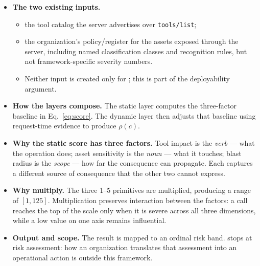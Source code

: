 \begin{itemize}
  \item \textbf{The two existing inputs.}
    \begin{itemize}
      \item the tool catalog the server advertises over \texttt{tools/list};
      \item the organization's policy/register for the assets exposed through
            the server, including named classification classes and recognition
            rules, but not framework-specific severity numbers.
      \item Neither input is created only for \framework{}; this is part of the
            deployability argument.
    \end{itemize}

  \item \textbf{How the layers compose.}
        The static layer computes the three-factor baseline in
        Eq.~\ref{eq:score}. The dynamic layer then adjusts that baseline using
        request-time evidence to produce $\rho(c)$.

  \item \textbf{Why the static score has three factors.}
        Tool impact is the \emph{verb} --- what the operation does; asset
        sensitivity is the \emph{noun} --- what it touches; blast radius is the
        \emph{scope} --- how far the consequence can propagate. Each captures a
        different source of consequence that the other two cannot express.

  \item \textbf{Why multiply.}
        The three 1--5 primitives are multiplied, producing a range of
        $[1,125]$. Multiplication preserves interaction between the factors: a
        call reaches the top of the scale only when it is severe across all
        three dimensions, while a low value on one axis remains influential.

  \item \textbf{Output and scope.}
        The result is mapped to an ordinal risk band. \framework{} stops at risk
        assessment: how an organization translates that assessment into an
        operational action is outside this framework.
\end{itemize}

